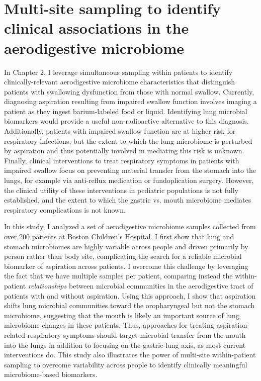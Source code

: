 \section{Multi-site sampling to identify clinical associations in the aerodigestive microbiome}

In Chapter 2, I leverage simultaneous sampling within patients to identify clinically-relevant aerodigestive microbiome characteristics that distinguish patients with swallowing dysfunction from those with normal swallow.
Currently, diagnosing aspiration resulting from impaired swallow function involves imaging a patient as they ingest barium-labeled food or liquid.
Identifying lung microbial biomarkers would provide a useful non-radioactive alternative to this diagnosis.
Additionally, patients with impaired swallow function are at higher risk for respiratory infections, but the extent to which the lung microbiome is perturbed by aspiration and thus potentially involved in mediating this risk is unknown.
Finally, clinical interventions to treat respiratory symptoms in patients with impaired swallow focus on preventing material transfer from the stomach into the lungs, for example via anti-reflux medication or fundoplication surgery.
However, the clinical utility of these interventions in pediatric populations is not fully established, and the extent to which the gastric vs. mouth microbiome mediates respiratory complications is not known.

In this study, I analyzed a set of aerodigestive microbiome samples collected from over 200 patients at Boston Children's Hospital.
I first show that lung and stomach microbiomes are highly variable across people and driven primarily by person rather than body site, complicating the search for a reliable microbial biomarker of aspiration across patients.
I overcome this challenge by leveraging the fact that we have multiple samples per patient, comparing instead the within-patient \textit{relationships} between microbial communities in the aerodigestive tract of patients with and without aspiration.
Using this approach, I show that aspiration shifts lung microbial communities toward the oropharyngeal but not the stomach microbiome, suggesting that the mouth is likely an important source of lung microbiome changes in these patients.
Thus, approaches for treating aspiration-related respiratory symptoms should target microbial transfer from the mouth into the lungs in addition to focusing on the gastric-lung axis, as most current interventions do.
This study also illustrates the power of multi-site within-patient sampling to overcome variability across people to identify clinically meaningful microbiome-based biomarkers.

